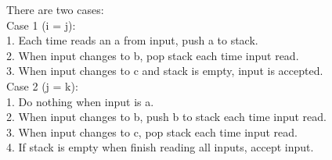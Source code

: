 \documentclass[12pt]{article}
\newenvironment{problem}[2][Problem]{\begin{trivlist}
\item[\hskip \labelsep {\bfseries #1}\hskip \labelsep {\bfseries #2.}]}{\end{trivlist}}
\begin{document}
\begin{problem}{2.10}
\end{problem}
	There are two cases:	\\
	Case 1 (i = j):	\\
	\hspace*{5mm} 1. Each time reads an a from input, push a to stack.	\\
	\hspace*{5mm} 2. When input changes to b, pop stack each time input read.	\\
	\hspace*{5mm} 3. When input changes to c and stack is empty, input is accepted.	\\
	Case 2 (j = k):	\\
	\hspace*{5mm} 1. Do nothing when input is a.	\\
	\hspace*{5mm} 2. When input changes to b, push b to stack each time input read.	\\
	\hspace*{5mm} 3. When input changes to c, pop stack each time input read.	\\
	\hspace*{5mm} 4. If stack is empty when finish reading all inputs, accept input.	

\begin{problem}{2.11}
\end{problem}

	
\end{document}
